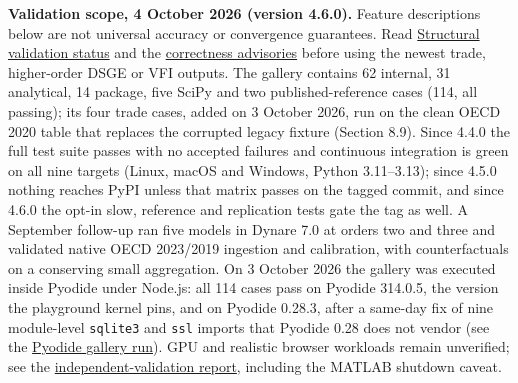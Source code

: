 \documentclass[11pt,letterpaper]{article}
\renewenvironment{quote}{\begin{tcolorbox}[colback=lightslate,colframe=cardborder,boxrule=0.6pt,
  arc=3mm,left=10pt,right=10pt,top=6pt,bottom=6pt,breakable]}{\end{tcolorbox}}
\renewcommand{\_}{\pmunderscore\allowbreak}
\begin{document}
\begin{quote}
\textbf{Validation scope, 4 October 2026 (version 4.6.0).} Feature descriptions below are not universal accuracy or convergence guarantees. Read \href{https://github.com/jalonso1979/puremacro/blob/v4.6.0/docs/STRUCTURAL_VALIDATION_STATUS.md}{Structural validation status} and the \href{https://github.com/jalonso1979/puremacro/blob/v4.6.0/docs/ADVISORY.md}{correctness advisories} before using the newest trade, higher-order DSGE or VFI outputs. The gallery contains 62 internal, 31 analytical, 14 package, five SciPy and two published-reference cases (114, all passing); its four trade cases, added on 3 October 2026, run on the clean OECD 2020 table that replaces the corrupted legacy fixture (Section 8.9). Since 4.4.0 the full test suite passes with no accepted failures and continuous integration is green on all nine targets (Linux, macOS and Windows, Python 3.11--3.13); since 4.5.0 nothing reaches PyPI unless that matrix passes on the tagged commit, and since 4.6.0 the opt-in slow, reference and replication tests gate the tag as well. A September follow-up ran five models in Dynare 7.0 at orders two and three and validated native OECD 2023/2019 ingestion and calibration, with counterfactuals on a conserving small aggregation. On 3 October 2026 the gallery was executed inside Pyodide under Node.js: all 114 cases pass on Pyodide 314.0.5, the version the playground kernel pins, and on Pyodide 0.28.3, after a same-day fix of nine module-level \texttt{sqlite3} and \texttt{ssl} imports that Pyodide 0.28 does not vendor (see the \href{https://github.com/jalonso1979/puremacro/blob/v4.6.0/reviews/2026-10-03-pyodide-gallery/REPORT.md}{Pyodide gallery run}). GPU and realistic browser workloads remain unverified; see the \href{https://github.com/jalonso1979/puremacro/blob/v4.6.0/reviews/2026-09-20-independent-validation/REPORT.md}{independent-validation report}, including the MATLAB shutdown caveat.
\end{quote}
\end{document}
